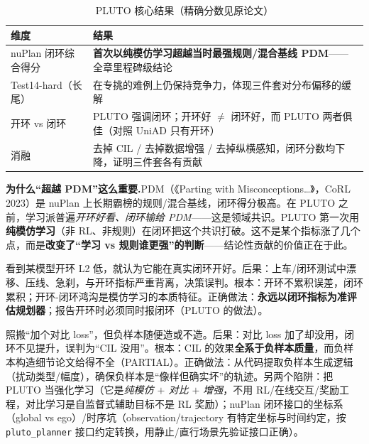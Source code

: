 \begin{table}[H]\centering\small
\caption{PLUTO 核心结果（精确分数见原论文）}
\label{tab:de-pluto-metrics}
\begin{tabular}{p{} p{}}
\toprule
维度 & 结果 \\
\midrule
nuPlan 闭环综合得分 & \textbf{首次以纯模仿学习超越当时最强规则/混合基线 PDM}——全章里程碑级结论 \\
Test14-hard（长尾） & 在专挑的难例上仍保持竞争力，体现三件套对分布偏移的缓解 \\
开环 vs 闭环 & PLUTO 强调闭环；开环好 $\neq$ 闭环好，而 PLUTO 两者俱佳（对照 UniAD 只有开环） \\
消融 & 去掉 CIL / 去掉数据增强 / 去掉纵横感知，闭环分数均下降，证明三件套各有贡献 \\
\bottomrule
\end{tabular}
\end{table}

\begin{note}
\textbf{为什么“超越 PDM”这么重要.}\;PDM（《Parting with Misconceptions\dots》，CoRL 2023\cite{dauner2023pdm}）是 nuPlan 上长期霸榜的规则/混合基线，闭环得分极高。在 PLUTO 之前，学习派普遍\emph{开环好看、闭环输给 PDM}——这是领域共识。PLUTO 第一次用\textbf{纯模仿学习}（非 RL、非规则）在闭环把这个共识打破。这不是某个指标涨了几个点，而是\textbf{改变了“学习 vs 规则谁更强”的判断}——结论性贡献的价值正在于此。
\end{note}

\begin{pitfall}
看到某模型开环 L2 低，就认为它能在真实闭环开好。后果：上车/闭环测试中漂移、压线、急刹，与开环指标严重背离，决策误判。根本：开环不累积误差，闭环累积；开环-闭环鸿沟是模仿学习的本质特征。正确做法：\textbf{永远以闭环指标为准评估规划器}；报告开环时必须同时报闭环（PLUTO 的做法）。
\end{pitfall}

\begin{pitfall}
照搬“加个对比 loss”，但负样本随便造或不造。后果：对比 loss 加了却没用，闭环不见提升，误判为“CIL 没用”。根本：CIL 的效果\textbf{全系于负样本质量}，而负样本构造细节论文给得不全（PARTIAL）。正确做法：从代码提取负样本生成逻辑（扰动类型/幅度），确保负样本是“像样但确实坏”的轨迹。另两个陷阱：把 PLUTO 当强化学习（它是\emph{纯模仿 $+$ 对比 $+$ 增强}，不用 RL/在线交互/奖励工程，对比学习是自监督式辅助目标不是 RL 奖励）；nuPlan 闭环接口的坐标系（global vs ego）/时序坑（observation/trajectory 有特定坐标与时间约定，按 \texttt{pluto\_planner} 接口约定转换，用静止/直行场景先验证接口正确）。
\end{pitfall}

